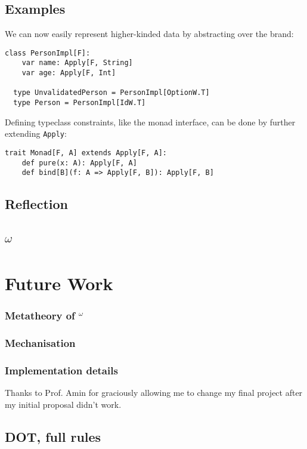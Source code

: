 \documentclass[acmsmall,screen]{acmart}
\newcommand{\DOTw}{\text{DOT}$^\omega$}
\begin{document}
\subsection{Examples}

We can now easily represent higher-kinded data by abstracting over the brand:
\begin{lstlisting}[style=scala]
  class PersonImpl[F]:
    var name: Apply[F, String]
    var age: Apply[F, Int]

  type UnvalidatedPerson = PersonImpl[OptionW.T]
  type Person = PersonImpl[IdW.T]
\end{lstlisting}

Defining typeclass constraints, like the monad interface, can be done by
further extending \texttt{Apply}:
\begin{lstlisting}[style=scala]
  trait Monad[F, A] extends Apply[F, A]:
    def pure(x: A): Apply[F, A]
    def bind[B](f: A => Apply[F, B]): Apply[F, B]
\end{lstlisting}

\subsection{Reflection}

\section{\DOTw{}}\label{sec::dotw}

\section{}\label{sec::trans}

\section{Future Work}

\subsubsection*{Metatheory of \DOTw{}}

\subsubsection*{Mechanisation}

\subsubsection*{Implementation details}

\begin{acks}
  Thanks to Prof. Amin for graciously allowing me to change my final project
  after my initial proposal didn't work.
\end{acks}


\typeout{}


\begin{appendices}
  \section{DOT, full rules}
\end{appendices}
\end{document}
